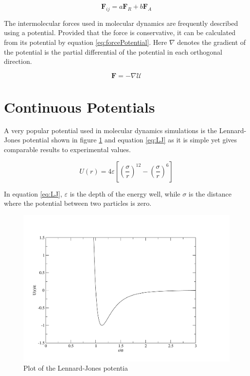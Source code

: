 \documentclass[12pt]{UoAthesis}
\begin{document}
\begin{equation}
  \mathbf{F}_{ij} = a\mathbf{F}_{R} + b\mathbf{F}_A
  \label{eq:tersoff}
\end{equation}

The intermolecular forces used in molecular dynamics are frequently
described using a potential.  Provided that the force is conservative,
it can be calculated from its potential by equation
\eqref{eq:forcePotential}. Here $\nabla$ denotes the gradient of the
potential is the partial differential of the potential in each
orthogonal direction.

\begin{equation} 
  \mathbf{F}=-\nabla \mathcal{U} 
  \label{eq:forcePotential} 
\end{equation}


\section{Continuous Potentials}


A very popular potential used in molecular dynamics simulations is the
Lennard-Jones potential \cite{Lennard-Jones1924} shown in figure
\ref{fig:ljPot} and equation \eqref{eq:LJ} as it is simple yet gives
comparable results to experimental values.

\begin{equation} 
  U(r) = 4 \varepsilon \left[ \left( \frac{\sigma}{r} \right)^{12}
    -\left( \frac{\sigma}{r} \right)^{6} \right] 
  \label{eq:LJ} 
\end{equation}

In equation \eqref{eq:LJ}, $\varepsilon$ is the depth of the energy
well, while $\sigma$ is the distance where the potential between two
particles is zero.

\begin{figure}[htp] 
  \begin{center}
    \includegraphics[clip,width=\textwidth]{figures/ljPlot} 
    \caption{\label{fig:ljPot} Plot of the Lennard-Jones potentia} 
  \end{center}
\end{figure}
\end{document}
